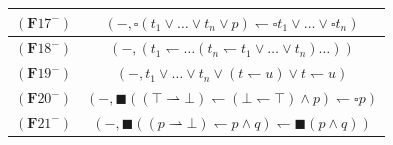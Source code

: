 \documentclass[draft]{article}
\def\Formula{\mathbf{A}}
\def\Formula{\mathbf{F}}
\begin{document}
\begin{table}[ht]
\begin{center}
\begin{tabular}{|c|c|}
%
%
%
%
%
%
%
%
%
%
%
%
%
%
%
%
%
%
%
%
%
%
%
%
%
%
%
%
%
%
%
%
%
%
%
%
%
%
%
%
%
%
%
%
%
%
$(\Formula17^{-})$&$(-,{\square}(t_{1}{\vee}\ldots{\vee}t_{n}{\vee}p){\leftharpoondown}{\square}t_{1}{\vee}\ldots{\vee}{\square}t_{n})$
%
%
\\
%
%
\hline
%
%
$(\Formula18^{-})$&$(-,(t_{1}{\leftharpoondown}\ldots(t_{n}{\leftharpoondown}t_{1}{\vee}\ldots{\vee}t_{n})\ldots))$
%
%
\\
%
%
\hline
%
%
%
%
%
%
%
%
$(\Formula19^{-})$&$(-,t_{1}{\vee}\ldots{\vee}t_{n}{\vee}(t{\leftharpoondown}u){\vee}t{\leftharpoondown}u)$
%
%
\\
%
%
\hline
%
%
%
%
%
%
%
%
$(\Formula20^{-})$&$(-,{\blacksquare}(({\top}{\rightharpoonup}{\bot}){\leftharpoondown}({\bot}{\leftharpoondown}{\top}){\wedge}p){\leftharpoondown}{\square}p)$
%
%
\\
%
%
\hline
%
%
$(\Formula21^{-})$&$(-,{\blacksquare}((p{\rightharpoonup}{\bot}){\leftharpoondown}p{\wedge}q){\leftharpoondown}{\blacksquare}(p{\wedge}q))$

\end{tabular}
\end{center}
\end{table}
\end{document}
